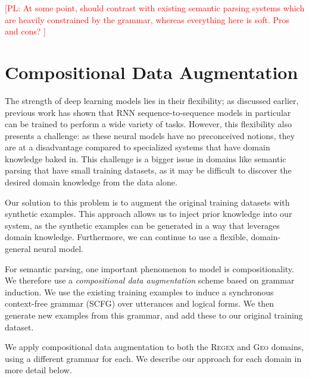 \documentclass[11pt,letterpaper]{article}
\newcommand{\regex}{\textsc{Regex}\xspace}
\newcommand{\geo}{\textsc{Geo}\xspace}
\newcommand\pl[1]{\textcolor{red}{[PL: #1]}}
\begin{document}
\pl{
  At some point, should contrast with existing semantic parsing systems
  which are heavily constrained by the grammar, whereas everything here is soft.
  Pros and cons?
}

\section{Compositional Data Augmentation}
The strength of deep learning models lies in their flexibility;
as discussed earlier, previous work has shown that
RNN sequence-to-sequence models in particular can be trained
to perform a wide variety of tasks.  
However, this flexibility also presents a challenge:
as these neural models have no preconceived notions,
they are at a disadvantage compared to specialized systems
that have domain knowledge baked in.
This challenge is a bigger issue in domains like semantic parsing
that have small training datasets, as
it may be difficult to discover the desired domain knowledge
from the data alone.

Our solution to this problem is to
augment the original training datasets with synthetic examples.
This approach allows us to inject prior knowledge into our system,
as the synthetic examples can be generated 
in a way that leverages domain knowledge.
Furthermore, we can continue to use a flexible, domain-general neural model.

For semantic parsing, one important phenomenon to model is compositionality.
We therefore use a \emph{compositional data augmentation} scheme
based on grammar induction.
We use the existing training examples to induce a
synchronous context-free grammar (SCFG) over utterances and logical forms.
We then generate new examples from this grammar,
and add these to our original training dataset.

We apply compositional data augmentation to both the \regex and \geo domains,
using a different grammar for each.
We describe our approach for each domain in more detail below.

\end{document}
